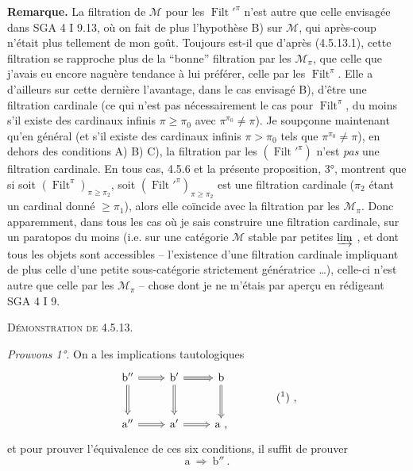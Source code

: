 \documentclass[11pt]{article}
\newcommand{\msp}[1]{\marginpar{\footnotesize [#1]}}
\newcommand{\Filt}{\operatorname{Filt}}
\begin{document}
\textbf{Remarque.} La filtration de $\mathcal{M}$ pour les $\Filt'^{\pi}$ n'est autre que celle envisagée dans SGA 4 I 9.13, où on fait de plus l'hypothèse B) sur $\mathcal{M}$, qui après-coup n'était plus tellement de mon goût. Toujours est-il que d'après (4.5.13.1), cette filtration se rapproche plus de la ``bonne'' filtration par les $\mathcal{M}_{\pi}$, que celle que j'avais eu encore naguère tendance à lui préférer, celle par les $\Filt^{\pi}$. Elle a d'ailleurs sur cette dernière l'avantage, dans le cas envisagé B), d'être une filtration cardinale (ce qui n'est pas nécessairement le cas pour $\Filt^{\pi}$, du moins s'il existe des cardinaux infinis $\pi \geqslant \pi_0$ avec $\pi^{\pi_0} \neq \pi$). Je soupçonne maintenant qu'en général (et s'il existe des cardinaux infinis $\pi > \pi_0$ tels que $\pi^{\pi_0} \neq \pi$), en dehors des conditions A) B) C), la filtration par les $(\Filt'^{\pi})$ n'est \textit{pas} une
\msp{page 128}
filtration cardinale. En tous cas, 4.5.6 et la présente proposition, 3°, montrent que si soit $(\Filt^{\pi})_{\pi\geqslant\pi_2}$, soit $(\Filt'^{\pi})_{\pi\geqslant\pi_2}$ est une filtration cardinale ($\pi_2$ étant un cardinal donné $\geqslant \pi_1$), alors elle coïncide avec la filtration par les $\mathcal{M}_{\pi}$. Donc apparemment, dans tous les cas où je sais construire une filtration cardinale, sur un paratopos du moins (i.e. sur une catégorie $\mathcal{M}$ stable par petites $\varinjlim$ , et dont tous les objets sont accessibles -- l'existence d'une filtration cardinale impliquant de plus celle d'une petite sous-catégorie strictement génératrice \dots), celle-ci n'est autre que celle par les $\mathcal{M}_{\pi}$ -- chose dont je ne m'étais par aperçu en rédigeant SGA 4 I 9. %

\textsc{Démonstration de 4.5.13.}

\textit{Prouvons 1°.} On a les implications tautologiques
\[
\begin{tikzcd}[row sep=large]
\mathrm{b}'' \arrow[r, Rightarrow] \arrow[d, Rightarrow] & \mathrm{b}' \arrow[r, Rightarrow] \arrow[d, Rightarrow] & \mathrm{b} \arrow[d, Rightarrow] \\
\mathrm{a}'' \arrow[r, Rightarrow] & \mathrm{a}' \arrow[r, Rightarrow] & \mathrm{a} \text{ ,}
\end{tikzcd}
\qquad\qquad \text{(\footnotemark) ,}
\]
et pour prouver l'équivalence de ces six conditions, il suffit de prouver
\[ \mathrm{a} \ \Longrightarrow \ \mathrm{b}'' \ . \]
\end{document}
